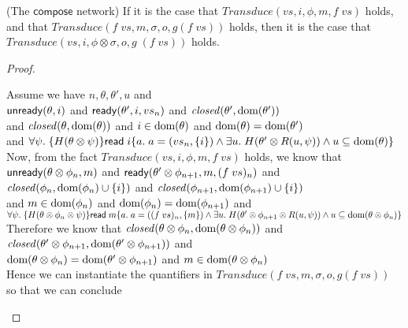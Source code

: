 \begin{lemma}{(The $\mathsf{compose}$ network)}
If it is the case that $\mathit{Transduce}(vs, i, \phi, m, f\;vs)$ holds, and that
$\mathit{Transduce}(f\;vs, m, \sigma, o, g(f\;vs))$ holds, then it is the case that
$\mathit{Transduce}(vs, i, \phi \otimes \sigma, o, g\;(f\;vs))$ holds.
\end{lemma}

\begin{proof}
\begin{tabbedproof}
\oo Assume we have $n, \theta, \theta', u$ and  \\
\oox $\mathsf{unready}({\theta}, {i})$ and $\mathsf{ready}({\theta'}, {i}, {vs_n})$ and $\mathit{closed}(\theta', \mbox{dom}({\theta'}))$\\
\oox and $\mathit{closed}(\theta, \mbox{dom}({\theta}))$ and $i \in \mbox{dom}({\theta})$ and $\mbox{dom}({\theta})=\mbox{dom}({\theta'})$ \\
\oox and $\forall \psi.\;\{{H(\theta \otimes \psi)}\}{\mathsf{read}\; i}\{{a}.\;{a = (vs_n, \{{i}\}) \land \exists u.\; H(\theta' \otimes R(u, \psi)) \land u \subseteq \mbox{dom}({\theta})}\}$ \\
\oo Now, from the fact $\mathit{Transduce}(vs, i, \phi, m, f\;vs)$ holds, we know that \\
\oo $\mathsf{unready}({\theta \otimes \phi_n}, {m})$ and $\mathsf{ready}({\theta' \otimes \phi_{n+1}}, {m}, {(f\;vs)_n})$ and \\
\oo $\mathit{closed}(\phi_n, \mbox{dom}({\phi_n}) \cup \{{i}\})$ and $\mathit{closed}(\phi_{n+1}, \mbox{dom}({\phi_{n+1}}) \cup \{{i}\})$ \\
\oo and $m \in \mbox{dom}({\phi_n})$ and $\mbox{dom}({\phi_n}) = \mbox{dom}({\phi_{n+1}})$ and \\
\oo $\forall \psi.\;\{{H(\theta \otimes \phi_n \otimes \psi)}\}{\mathsf{read}\; m}\{{a}.\;{a = ((f\;vs)_n, \{{m}\}) \land \exists u.\; H(\theta' \otimes \phi_{n+1} \otimes R(u, \psi)) \land u \subseteq \mbox{dom}({\theta \otimes \phi_n})}\}$ \\
\oo Therefore we know that $\mathit{closed}(\theta \otimes \phi_n, \mbox{dom}({\theta \otimes \phi_n}))$ and \\
\oo $\mathit{closed}(\theta' \otimes \phi_{n+1}, \mbox{dom}({\theta' \otimes \phi_{n+1}}))$ and \\
\oo $\mbox{dom}({\theta \otimes \phi_n}) = \mbox{dom}({\theta' \otimes \phi_{n+1}})$ and $m \in \mbox{dom}({\theta \otimes \phi_n})$ \\
\oo Hence we can instantiate the quantifiers in $\mathit{Transduce}(f\;vs, m, \sigma, o, g(f\;vs))$ \\
\oo so that we can conclude \\

\end{tabbedproof}
\end{proof}
